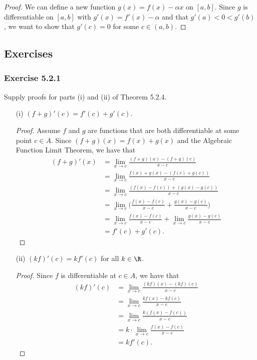 \begin{proof}
    We can define a new function \( g(x) = f(x) - \alpha x  \) on \( [a,b]  \). Since \( g  \) is differentiable on \( [a,b]  \) with \( g'(x)  = f'(x) - \alpha  \) and that \( g'(a) < 0 < g'(b)  \), we want to show that \( g'(c) = 0  \) for some \( c \in (a,b)  \).
\end{proof}

\subsection{Exercises}


\subsubsection{Exercise 5.2.1} Supply proofs for parts (i) and (ii) of Theorem 5.2.4.
\begin{enumerate}
    \item[(i)] \( (f+g)'(c) = f'(c) + g'(c)  \).
        \begin{proof}
        Assume \( f  \) and \( g  \) are functions that are both differentiable at some point \( c \in A  \). Since \( (f+g)(x) = f(x) + g(x)  \) and the Algebraic Function Limit Theorem, we have that
        \begin{align*}
            (f+g)'(x) &= \lim_{ x \to c } \frac{ (f+g)(x) - (f+g)(c) }{ x - c  }  \\
                      &= \lim_{ x \to c } \frac{ f(x) + g(x) - (f(c) + g(c) ) }{ x - c  } \\
                      &= \lim_{ x \to c  } \frac{ ( f(x) - f(c)) + (g(x) - g(c)) }{ x - c  } \\
                      &= \lim_{ x \to c  } \Big(  \frac{ f(x) - f(c)  }{ x - c  } + \frac{ g(x) - g(c)   }{ x - c  }  \Big) \\
                      &= \lim_{ x \to c  }  \frac{ f(x) - f(c)  }{ x - c  } + \lim_{ x \to c  } \frac{ g(x) - g(c)  }{ x - c  } \\
                      &= f'(c) + g'(c).
        \end{align*}
        \end{proof}
    \item[(ii)] \( (kf)'(c) = k f'(c)  \) for all \( k \in \R  \).
        \begin{proof}
        Since \( f  \) is differentiable at \( c \in A  \), we have that 
        \begin{align*}
            (kf)'(c) &= \lim_{ x \to c  } \frac{ (kf)(x) - (kf)(c)  }{ x - c  }  \\
                     &= \lim_{ x \to c  }  \frac{ k f(x) - k f(c)  }{ x - c  } \\
                     &= \lim_{ x \to c  } \frac{ k (f(x) - f(c) ) }{ x - c  } \\
                     &=k \cdot  \lim_{ x \to c  } \frac{ f(x) - f(c) }{ x - c  } \\
                     &= k f'(c).
        \end{align*}
        \end{proof}
\end{enumerate}

